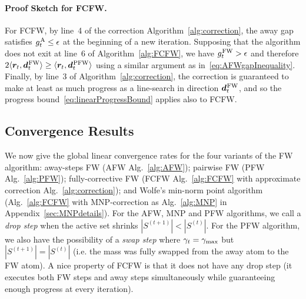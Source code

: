 \documentclass{article} %
\newcommand{\stepsize}{\gamma}
\newcommand{\stepmax}{\stepsize_{\textnormal{\scriptsize max}}} %
\newcommand{\FW}{{\hspace{0.05em}\textnormal{FW}}}
\newcommand{\PFW}{{\hspace{0.05em}\textnormal{PFW}}}
\newcommand{\away}{{\hspace{0.06em}\textnormal{\scriptsize A}}}
\newcommand{\dd}{\bm{d}}
\renewcommand{\r}{\bm{r}}
\newcommand{\innerProdCompressed}[2]{\langle #1 , #2 \rangle}
\newcommand{\0}{\mathbf{0}} %
\begin{document}
\paragraph{Proof Sketch for FCFW.} For FCFW, by line~4 of the
%
correction Algorithm~\ref{alg:correction}, 
the away gap satisfies $g_t^\away \leq \epsilon$
at the beginning of a new iteration.
Supposing that the algorithm does not exit at line~6 of
Algorithm~\ref{alg:FCFW}, we have $g_t^\FW > \epsilon$ and therefore $2
\innerProdCompressed{\r_t}{\dd_t^\FW} \geq
\innerProdCompressed{\r_t}{\dd_t^\PFW}$ using a similar argument as
in~\eqref{eq:AFWgapInequality}. Finally, by line~3 of Algorithm~\ref{alg:correction}, the correction is
guaranteed to make at least as much progress as a line-search in direction
$\dd_t^\FW$, and so the progress bound~\eqref{eq:linearProgressBound} applies also to FCFW.\vspace{-2mm}

%
\subsection{Convergence Results}\label{sec:theorems}\vspace{-2mm}
We now give the global linear convergence rates for the four variants of the
FW algorithm: away-steps FW (AFW Alg.~\ref{alg:AFW}); pairwise FW
(PFW Alg.~\ref{alg:PFW}); fully-corrective FW (FCFW
Alg.~\ref{alg:FCFW} with approximate correction Alg.~\ref{alg:correction}); and Wolfe's
min-norm point algorithm (Alg.~\ref{alg:FCFW} with
MNP-correction as Alg.~\ref{alg:MNP} in Appendix~\ref{sec:MNPdetails}). For the AFW, MNP  and PFW algorithms, we call
a \emph{drop step} when the active set shrinks $|S^{(t+1)}| < |S^{(t)}|$. For
the PFW algorithm, we also have the possibility of a \emph{swap step} where
$\stepsize_t = \stepmax$ but $|S^{(t+1)}| = |S^{(t)}|$ (i.e. the mass was
fully swapped from the away atom to the FW atom). 
A nice property of FCFW is that it does not have any drop step (it executes both FW steps and away steps simultaneously while guaranteeing enough progress at
every iteration).
\end{document}
